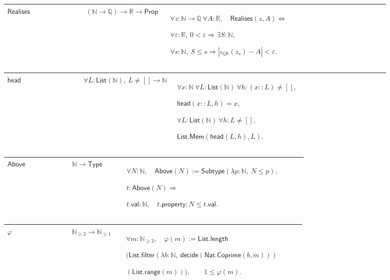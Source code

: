 \documentclass[12pt,reqno]{amsart}
\newcommand{\N}{\mathbb N}
\newcommand{\Q}{\mathbb Q}
\newcommand{\R}{\mathbb R}
\newcommand{\Np}{\N_{\ge1}}
\theoremstyle{blueplain}
\newcounter{type}
\numberwithin{equation}{section}
\def\hyperlink#1#2{#2}}
\begin{document}
\par\setlength{\parskip}{0pt}\nointerlineskip
\noindent
\begin{tabular}{|@{}p{0.19251\linewidth}|p{0.16845\linewidth}|p{0.53904\linewidth}|}\hline
{\hypertarget{def:Realises}{\(\textsf{Realises}\)}} & {\((\N\to\Q)\to\R\to\textsf{Prop}\)} & {\(\displaystyle \forall z:\N\to\Q\ \forall A:\R,\quad \hyperlink{def:Realises}{\ensuremath{\textsf{Realises}}}(z,A)\Longleftrightarrow\)
\par
\(\displaystyle \forall\varepsilon:\R,\ 0<\varepsilon\Rightarrow\exists S:\N,\)
\par
\(\displaystyle \forall s:\N,\ S\le s\Rightarrow|\iota_{\Q\R}(z_s)-A|<\varepsilon.\)}\\
\hline
\end{tabular}%
\par\setlength{\parskip}{0pt}\nointerlineskip
\noindent
\begin{tabular}{|@{}p{0.19251\linewidth}|p{0.16845\linewidth}|p{0.53904\linewidth}|}\hline
{\hypertarget{def:head}{\(\textsf{head}\)}} & {\(\forall L:\textsf{List}(\N),\ L\ne[]\to\N\)} & {\(\displaystyle \forall x:\N\ \forall L:\textsf{List}(\N)\ \forall h:(x::L)\ne[],\)
\par
\(\displaystyle \hyperlink{def:head}{\ensuremath{\textsf{head}}}(x::L,h)=x,\)
\par
\(\displaystyle \forall L:\textsf{List}(\N)\ \forall h:L\ne[],\)
\par
\(\displaystyle \textsf{List.Mem}(\hyperlink{def:head}{\ensuremath{\textsf{head}}}(L,h),L).\)}\\
\hline
\end{tabular}%
\par\setlength{\parskip}{0pt}\nointerlineskip
\noindent
\begin{tabular}{|@{}p{0.19251\linewidth}|p{0.16845\linewidth}|p{0.53904\linewidth}|}\hline
{\hypertarget{def:Above}{\(\textsf{Above}\)}} & {\(\N\to\textsf{Type}\)} & {\(\displaystyle \forall N:\N,\quad \hyperlink{def:Above}{\ensuremath{\textsf{Above}}}(N):=\textsf{Subtype}(\lambda p:\N,\ N\le p),\)
\par
\(\displaystyle t:\hyperlink{def:Above}{\ensuremath{\textsf{Above}}}(N)\Rightarrow\)
\par
\(\displaystyle t.\textsf{val}:\N,\quad t.\textsf{property}:N\le t.\textsf{val}.\)}\\
\hline
\end{tabular}
\par\setlength{\parskip}{0pt}\nointerlineskip
\noindent
\begin{tabular}{|@{}p{0.19251\linewidth}|p{0.16845\linewidth}|p{0.53904\linewidth}|}\hline
{\hypertarget{def:Totient}{\(\varphi\)}} & {\(\N_{\ge2}\to\Np\)} & {\(\displaystyle \forall m:\N_{\ge2},\quad\varphi(m):=\textsf{List.length}\)
\par
\(\displaystyle \bigl(\textsf{List.filter}(\lambda b:\N,\ \textsf{decide}(\hyperlink{def:Nat.Coprime}{\ensuremath{\textsf{Nat.Coprime}}}(b,m)))\)
\par
\(\displaystyle (\textsf{List.range}(m))\bigr),\qquad1\le\varphi(m).\)}\\
\hline
\end{tabular}
\end{document}
